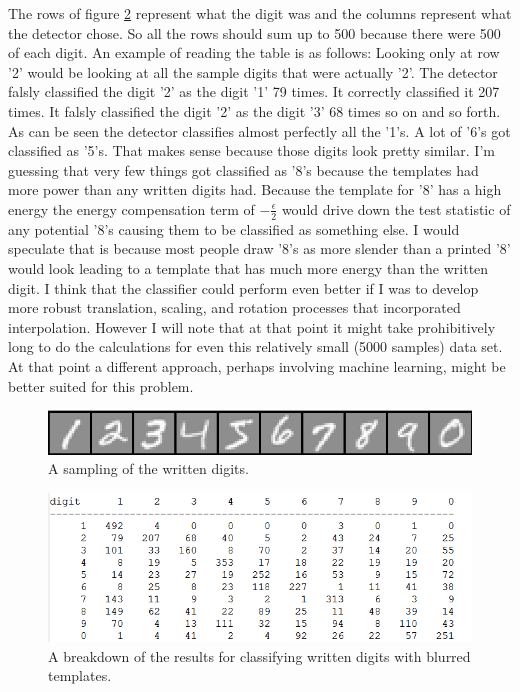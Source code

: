 \documentclass[12pt]{article}
\begin{document}
	The rows of figure \ref{fig:resultsbreakdown} represent what the digit was and the 
		columns represent what the detector chose.
	So all the rows should sum up to 500 because there were 500 of each digit.
	An example of reading the table is as follows:
	Looking only at row '2' would be looking at all the sample digits that were actually
		'2'.
	The detector falsly classified the digit '2' as the digit '1' 79 times.
	It correctly classified it 207 times. 
	It falsly classified the digit '2' as the digit '3' 68 times so on and so forth.
	As can be seen the detector classifies almost perfectly all the '1's. A lot of '6's
		got classified as '5's.
	That makes sense because those digits look pretty similar.
	I'm guessing that very few things got classified as '8's because the templates had more
		power than any written digits had.
	Because the template for '8' has a high energy the energy compensation term of
		$-\frac{\epsilon}{2}$ would drive down the test statistic of any potential
		'8's causing them to be classified as something else.
	I would speculate that is because most people draw '8's as more slender than a printed
		'8' would look leading to a template that has much more energy than the written 
		digit.
	I think that the classifier could perform even better if I was to develop more 
		robust translation, scaling, and rotation processes that incorporated interpolation.
	However I will note that at that point it might take prohibitively long to do the
		calculations for even this relatively small (5000 samples) data set.
	At that point a different approach, perhaps involving machine learning,
		might be better suited for this problem.
	\begin{figure}[h]
		\centering
		\includegraphics[width=\textwidth]{writtenDigits.png}
		\caption{A sampling of the written digits.}
		\label{fig:writtenDigits}
	\end{figure}
	\begin{figure}[h]
		\centering
		\includegraphics[width=\textwidth]{resultbreakdown.png}
		\caption{A breakdown of the results for classifying written digits with
		blurred templates.}
		\label{fig:resultsbreakdown}
	\end{figure}
\pagebreak
\end{document}
